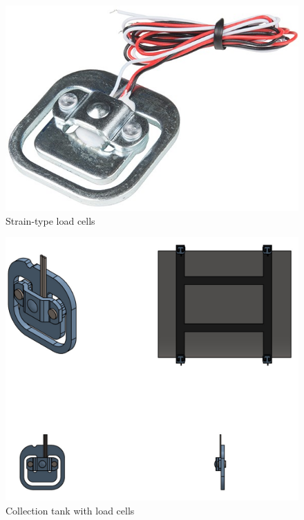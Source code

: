 \begin{itemize}
   \begin{figure}[H]
        \centering
        \includegraphics[width=.25\textwidth, height=.25\textheight]{Figures/50KgLoadCell.jpg}
        \caption[Strain-type load cells]{Strain-type load cells \cite{loadcell}}
        \label{fig:load_cell_disc}
    \end{figure}
    \begin{figure}[H]
    \centering
    \includegraphics[height=.45\textheight]{Figures/CollectionTankWithTheLoadCells.jpg}
    \caption{Collection tank with load cells}
    \label{fig:collection_tank_with_load_cells}
\end{figure}


\end{itemize}
